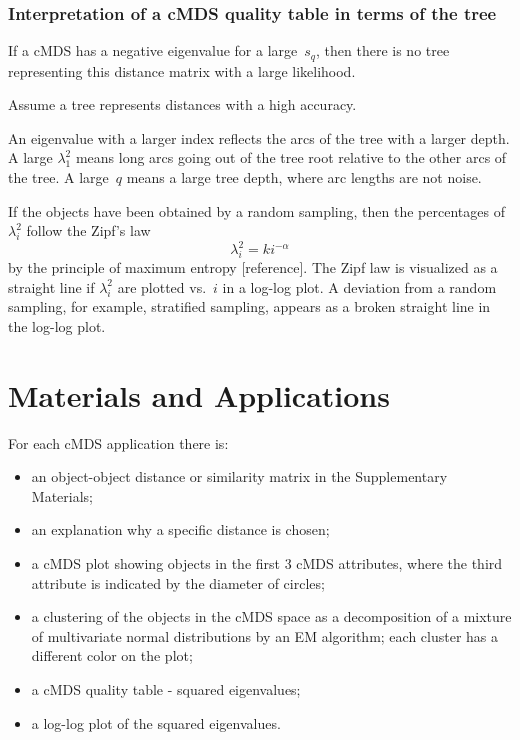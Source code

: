 \documentclass[10pt,a4paper]{article}
\begin{document}
\subsubsection {Interpretation of a cMDS quality table in terms of the tree}

If a cMDS has a negative eigenvalue for a large~$s_q$, then there is no tree representing this distance matrix with a large likelihood.

Assume a tree represents distances with a high accuracy.

An eigenvalue with a larger index reflects the arcs of the tree with a larger depth.
A large $\lambda_1^2$ means long arcs going out of the tree root relative to the other arcs of the tree.
A large~$q$ means a large tree depth, where arc lengths are not noise.

If the objects have been obtained by a random sampling, then the percentages of $\lambda_i^2$ follow the Zipf's law
$$ \lambda_i^2 = k i^{-\alpha}$$
by the principle of maximum entropy [reference].
The Zipf law is visualized as a straight line if $\lambda_i^2$ are plotted vs.~$i$ in a log-log plot.
A deviation from a random sampling, for example, stratified sampling, appears as a broken straight line in the log-log plot.



\section{Materials and Applications}

For each cMDS application there is:
\begin{itemize}
\item an object-object distance or similarity matrix in the Supplementary Materials;
\item an explanation why a specific distance is chosen;
\item a cMDS plot showing objects in the first 3 cMDS attributes,
  where the third attribute is indicated by the diameter of circles;
\item a clustering of the objects in the cMDS space
      as a decomposition of a mixture of multivariate normal distributions by an EM  algorithm;
      each cluster has a different color on the plot;
\item a cMDS quality table - squared eigenvalues;
\item a log-log plot of the squared eigenvalues.
\end{itemize}
\end{document}

